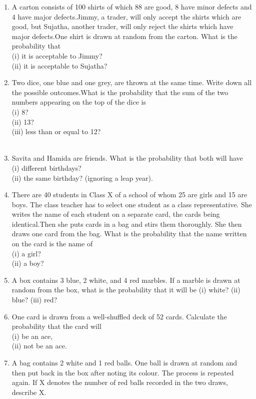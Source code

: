 \begin{enumerate}[label=\thesection.\arabic*.,ref=\thesection.\theenumi]
\item A carton consists of 100 shirts of which 88 are good, 8 have minor defects and 4 have major defects.Jimmy, a trader, will only accept the shirts which are good, but Sujatha, another trader, will only reject the shirts which have major defects.One shirt is drawn at random from the carton. What is the probability that\\
(i) it is acceptable to Jimmy?\\
(ii) it is acceptable to Sujatha?
\item Two dice, one blue and one grey, are thrown at the same time. Write down all the possible outcomes.What is the probability that the sum of the two numbers appearing on the top of the dice is\\
(i) 8?\\
(ii) 13?\\ 
(iii) less than or equal to 12?\\\\
\item Savita and Hamida are friends. What is the probability that both will have \\
(i) different birthdays? \\
(ii) the same birthday? (ignoring a leap year).
\item There are 40 students in Class X of a school of whom 25 are girls and 15 are boys. The class teacher has to select one student as a class representative. She writes the name of each student on a separate card, the cards being identical.Then
she puts cards in a bag and stirs them thoroughly. She then draws one card from the
bag. What is the probability that the name written on the card is the name of\\
(i) a girl?\\
(ii) a boy?
\item  A box contains 3 blue, 2 white, and 4 red marbles. If a marble is drawn
at random from the box, what is the probability that it will be
(i) white? (ii) blue? (iii) red?
\\
\item One card is drawn from a well-shuffled deck of 52 cards. Calculate the
probability that the card will\\
(i) be an ace,\\
(ii) not be an ace.
\\
\item A bag contains 2 white and 1 red balls. One ball is drawn at random and then put back in the box after noting its colour. The process is repeated again. If X denotes the number of red balls recorded in the two draws, describe X.\\


\end{enumerate}
